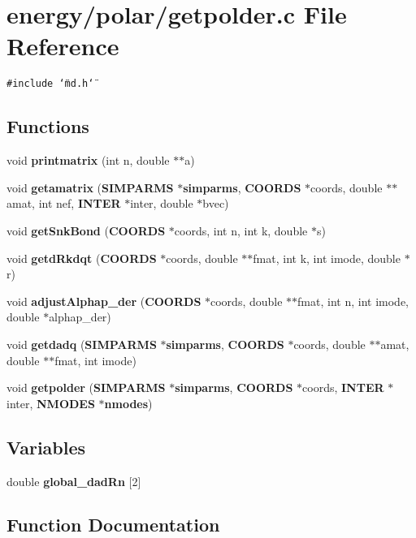 \section{energy/polar/getpolder.c File Reference}
\label{getpolder_8c}
{\tt \#include \char`\"{}md.h\char`\"{}}\par
\subsection*{Functions}
\begin{CompactItemize}
\item 
void {\bf printmatrix} (int n, double $\ast$$\ast$a)
\item 
void {\bf getamatrix} ({\bf SIMPARMS} $\ast${\bf simparms}, {\bf COORDS} $\ast$coords, double $\ast$$\ast$amat, int nef, {\bf INTER} $\ast$inter, double $\ast$bvec)
\item 
void {\bf get\-Snk\-Bond} ({\bf COORDS} $\ast$coords, int n, int k, double $\ast$s)
\item 
void {\bf getd\-Rkdqt} ({\bf COORDS} $\ast$coords, double $\ast$$\ast$fmat, int k, int imode, double $\ast$r)
\item 
void {\bf adjust\-Alphap\_\-der} ({\bf COORDS} $\ast$coords, double $\ast$$\ast$fmat, int n, int imode, double $\ast$alphap\_\-der)
\item 
void {\bf getdadq} ({\bf SIMPARMS} $\ast${\bf simparms}, {\bf COORDS} $\ast$coords, double $\ast$$\ast$amat, double $\ast$$\ast$fmat, int imode)
\item 
void {\bf getpolder} ({\bf SIMPARMS} $\ast${\bf simparms}, {\bf COORDS} $\ast$coords, {\bf INTER} $\ast$inter, {\bf NMODES} $\ast${\bf nmodes})
\end{CompactItemize}
\subsection*{Variables}
\begin{CompactItemize}
\item 
double {\bf global\_\-dad\-Rn} [2]
\end{CompactItemize}


\subsection{Function Documentation}
